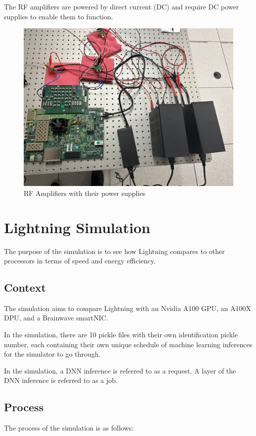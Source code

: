 \documentclass[11pt]{article}
\begin{document}
The RF amplifiers are powered by direct current (DC) and require DC power supplies to enable them to function.

\begin{figure}[H]
    \centering
    \includegraphics[width=0.5\linewidth]{rfamplifiers.jpg}
    \caption{RF Amplifiers with their power supplies}
    \label{fig:enter-label}
\end{figure}

\section{Lightning Simulation}

The purpose of the simulation is to see how Lightning compares to other processors in terms of speed and energy efficiency.

\subsection{Context}

The simulation aims to compare Lightning with an Nvidia A100 GPU, an A100X DPU, and a Brainwave smartNIC.

In the simulation, there are 10 pickle files with their own identification pickle number, each containing their own unique schedule of machine learning inferences for the simulator to go through.

In the simulation, a DNN inference is referred to as a request. A layer of the DNN inference is referred to as a job. 

\subsection{Process}
The process of the simulation is as follows:
\end{document}

